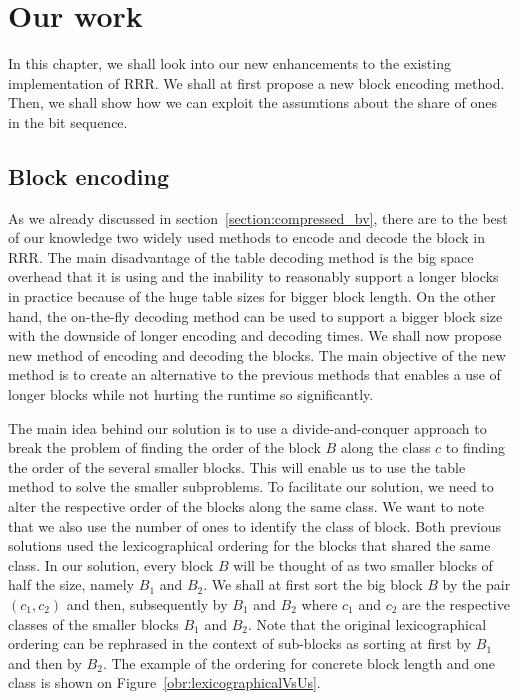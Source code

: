\chapter{Our work}
\label{kap:kap3}

In this chapter, we shall look into our new enhancements to the existing
implementation of RRR. We shall at first propose a new block encoding
method. Then, we shall show how we can exploit the assumtions about the
share of ones in the bit sequence.  

\section{Block encoding}

As we already discussed in section~\ref{section:compressed_bv}, there are to
the best of our knowledge two widely used methods to encode and decode the
block in RRR. The main disadvantage of the table decoding method is the big space
overhead that it is using and the inability to reasonably support a longer blocks
in practice because of the huge table sizes for bigger block length. On the
other hand, the on-the-fly decoding method can be used to support a bigger block size
with the downside of longer encoding and decoding times. We shall now propose
new method of encoding and decoding the blocks. The main objective of the new method is
to create an alternative to the previous methods that enables a use of longer blocks
while not hurting the runtime so significantly.

The main idea behind our solution is to use a divide-and-conquer approach to break
the problem of finding the order of the block $B$ along the class $c$ to finding the order
of the several smaller blocks. This will enable us to use the table method to solve the
smaller subproblems. To facilitate our solution, we need to alter the respective order of
the blocks along the same class. We want to note that we also use the number of ones to
identify the class of block. Both previous solutions used the lexicographical ordering
for the blocks that shared the same class. In our solution, every block $B$ will be thought
of as two smaller blocks of half the size, namely $B_1$ and $B_2$. We shall at first sort the
big block $B$ by the pair $(c_1, c_2)$ and then, subsequently by $B_1$ and $B_2$ where $c_1$
and $c_2$ are the respective classes of the smaller blocks $B_1$ and $B_2$. Note that the
original lexicographical ordering can be rephrased in the context of sub-blocks as sorting
at first by $B_1$ and then by $B_2$. The example of the ordering for concrete block length
and one class is shown on Figure~\ref{obr:lexicographicalVsUs}.

